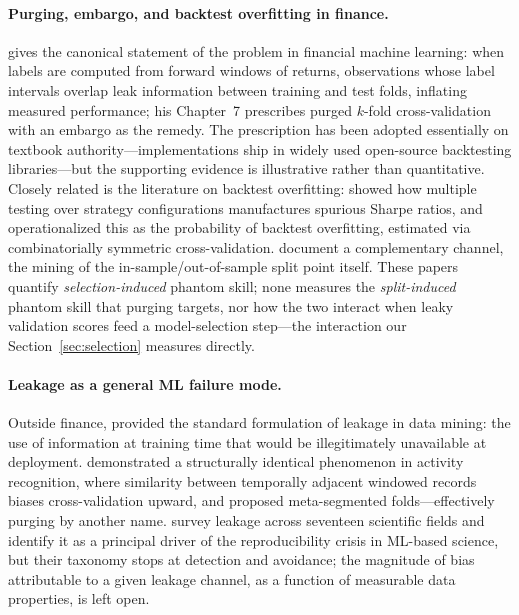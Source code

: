 \documentclass[11pt]{article}
\begin{document}
\paragraph{Purging, embargo, and backtest overfitting in finance.}
\citet{lopezdeprado2018advances} gives the canonical statement of the problem
in financial machine learning: when labels are computed from forward windows
of returns, observations whose label intervals overlap leak information
between training and test folds, inflating measured performance; his
Chapter~7 prescribes purged $k$-fold cross-validation with an embargo as the
remedy. The prescription has been adopted essentially on textbook
authority---implementations ship in widely used open-source backtesting
libraries---but the supporting evidence is illustrative rather than
quantitative. Closely related is the literature on backtest overfitting:
\citet{bailey2014pseudo} showed how multiple testing over strategy
configurations manufactures spurious Sharpe ratios, and
\citet{bailey2017probability} operationalized this as the probability of
backtest overfitting, estimated via combinatorially symmetric
cross-validation. \citet{hansen2012choice} document a complementary channel,
the mining of the in-sample/out-of-sample split point itself. These papers
quantify \emph{selection-induced} phantom skill; none measures the
\emph{split-induced} phantom skill that purging targets, nor how the two
interact when leaky validation scores feed a model-selection step---the
interaction our Section~\ref{sec:selection} measures directly.

\paragraph{Leakage as a general ML failure mode.} Outside finance,
\citet{kaufman2012leakage} provided the standard formulation of leakage in
data mining: the use of information at training time that would be
illegitimately unavailable at deployment. \citet{hammerla2015lets}
demonstrated a structurally identical phenomenon in activity recognition,
where similarity between temporally adjacent windowed records biases
cross-validation upward, and proposed meta-segmented folds---effectively
purging by another name. \citet{kapoor2023leakage} survey leakage across
seventeen scientific fields and identify it as a principal driver of the
reproducibility crisis in ML-based science, but their taxonomy stops at
detection and avoidance; the magnitude of bias attributable to a given
leakage channel, as a function of measurable data properties, is left open.
\end{document}
